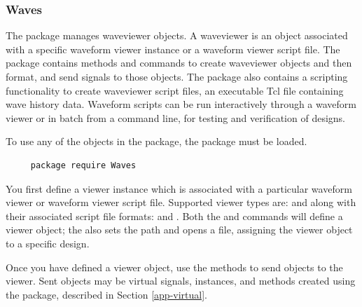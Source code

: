 \subsubsection{Waves}

\label{app-Waves}

The  package manages
waveviewer objects.  A waveviewer  is an  object associated
with a specific waveform viewer instance or a waveform viewer script
file.  The  package contains methods and commands to  
 create   waveviewer objects and then  format,  and send
signals to those  objects.  The package also contains a scripting
functionality to  create waveviewer
script files, an executable Tcl file containing wave history
data. Waveform scripts  can be run
interactively through a waveform viewer or in batch from a command
line, for testing and verification of  designs.


To use any of the objects in the  package, the package
must be loaded.

\begin{verbatim}
     package require Waves
\end{verbatim}

  

You first  define a  viewer
instance which is associated with a particular waveform viewer or
waveform viewer script file.  Supported viewer types  are:  and 
along with their associated 
script file formats:  and .  Both the
 and   commands will
define a  viewer object;  the  
also sets the path and opens a  file, assigning the viewer
object to a specific design.  

Once you have defined a viewer object, use the  methods to
 send objects to the viewer. 
  Sent objects may be virtual
signals, instances, and methods created using the 
package, described in Section \ref{app-virtual}.




